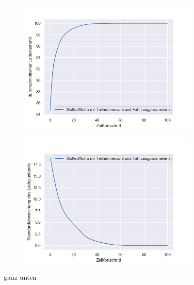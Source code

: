 \begin{figure}
	\begin{subfigure}{0.49\linewidth}
		\includegraphics[width=\linewidth]{img/SA_wT/SlottedAloha_waitingTime_VDE_tau_6_soc_mean.png}
        \label{ABB_SAwtSocMEAN}
	\end{subfigure}
	\begin{subfigure}{0.49\linewidth}
		\includegraphics[width=\linewidth]{img/SA_wT/SlottedAloha_waitingTime_VDE_tau_6_soc_std.png}
        \label{ABB_SAwtSocSTD}
	\end{subfigure}
	\caption{ganz unten}
\end{figure}

